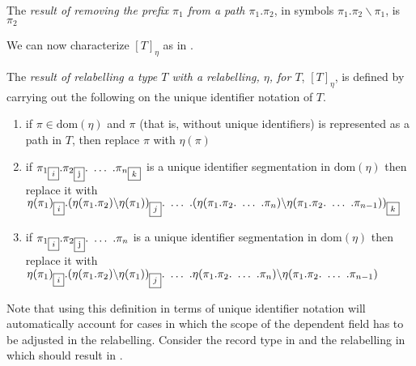 \begin{shaded}
\begin{ex}
\begin{subex}
  
\item The \textit{result of removing the prefix $\pi_1$ from a path
  $\pi_1.\pi_2$}, in symbols $\pi_1.\pi_2\backslash\pi_1$, is $\pi_2$
 
\end{subex} 
   
\end{ex}
We can now characterize $[T]_\eta$ as in \nexteg{}.
\begin{ex} 
The \textit{result of relabelling a type $T$ with a relabelling,
  $\eta$, for $T$}, $[T]_\eta$, is defined by carrying out the
following on the unique identifier notation of $T$.
\begin{enumerate} 
 
\item if $\pi\in\mathrm{dom}(\eta)$ and $\pi$ (that is, without unique
  identifiers) is represented as a path in $T$, then replace $\pi$
  with $\eta(\pi)$ 
 
\item if ${\pi_1}_{\text{\fbox{$i$}}}.{\pi_2}_{\text{\fbox{j}}}.\ \ldots\
  .{\pi_n}_{\text{\fbox{$k$}}}$ is a unique identifier
  segmentation in $\mathrm{dom}(\eta)$ then replace it with
  $\eta(\pi_1)_{\text{\fbox{$i$}}}.(\eta(\pi_1.\pi_2)\backslash\eta(\pi_1))_{\text{\fbox{$j$}}}.\
  \ldots\ .(\eta(\pi_1.\pi_2.\ \ldots\
  .\pi_n)\backslash\eta(\pi_1.\pi_2.\ \ldots\
  .\pi_{n-1}))_{\text{\fbox{$k$}}}$

  
\item if ${\pi_1}_{\text{\fbox{$i$}}}.{\pi_2}_{\text{\fbox{j}}}.\ \ldots\
  .{\pi_n}$ is a unique identifier segmentation in
  $\mathrm{dom}(\eta)$ then replace it with $\eta(\pi_1)_{\text{\fbox{$i$}}}.(\eta(\pi_1.\pi_2)\backslash\eta(\pi_1))_{\text{\fbox{$j$}}}.\
  \ldots\ .\eta(\pi_1.\pi_2.\ \ldots\
  .\pi_n)\backslash\eta(\pi_1.\pi_2.\ \ldots\
  .\pi_{n-1})$

\end{enumerate} 
  
\end{ex}

Note that using this definition in terms of unique identifier notation
will automatically account for cases in which the scope of the
dependent field has to be adjusted in the relabelling.  Consider the
record type in  and the relabelling in  which
should result in .
\begin{ex} 
\begin{subex} 
 
\item {} 
 

\end{subex}
\end{ex}
\end{shaded}
